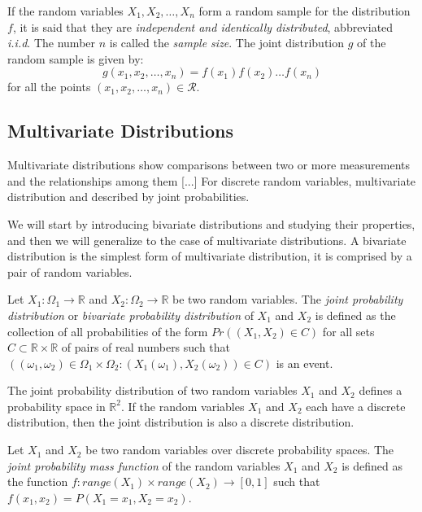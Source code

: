 If the random variables $X_1, X_2, \ldots, X_n$ form a random sample for the distribution $f$, it is said that they are \emph{independent and identically distributed}, abbreviated \emph{i.i.d}. The number $n$ is called the \emph{sample size}. The joint distribution $g$ of the random sample is given by:
\[
g \left( x_1, x_2, \ldots, x_n \right) = f \left( x_1 \right) f \left( x_2 \right) \ldots f \left( x_n \right)
\]
for all the points $\left( x_1, x_2, \ldots, x_n \right) \in \mathcal{R}$.


\subsection{Multivariate Distributions}

{\color{red} Multivariate distributions show comparisons between two or more measurements and the relationships among them [...]  For discrete random variables, multivariate distribution and described by joint probabilities.}

We will start by introducing bivariate distributions and studying their properties, and then we will generalize to the case of multivariate distributions. A bivariate distribution is the simplest form of multivariate distribution, it is comprised by a pair of random variables.

\begin{definition}
Let $X_1 : \Omega_1 \rightarrow \mathbb{R}$ and $X_2 : \Omega_2 \rightarrow \mathbb{R}$ be two random variables. The \emph{joint probability distribution} or \emph{bivariate probability distribution} of $X_1$ and $X_2$ is defined as the collection of all probabilities of the form $Pr\left( \left( X_1, X_2 \right) \in C \right)$ for all sets $C \subset \mathbb{R} \times \mathbb{R}$ of pairs of real numbers such that $\left( \left( \omega_1, \omega_2 \right) \in \Omega_1 \times \Omega_2: \left( X_1 \left( \omega_1 \right), X_2 \left( \omega_2 \right) \right) \in C \right)$ is an event.
\end{definition}

The joint probability distribution of two random variables $X_1$ and $X_2$ defines a probability space in $\mathbb{R}^2$. If the random variables $X_1$ and $X_2$ each have a discrete distribution, then the joint distribution is also a discrete distribution.

\begin{definition}
Let $X_1$ and $X_2$ be two random variables over discrete probability spaces. The \emph{joint probability mass function} of the random variables $X_1$ and $X_2$ is defined as the function $f : range \left( X_1 \right) \times range \left( X_2 \right) \rightarrow [0, 1]$ such that $f \left( x_1, x_2 \right) = P \left( X_1 = x_1, X_2 = x_2 \right)$.
\end{definition}

